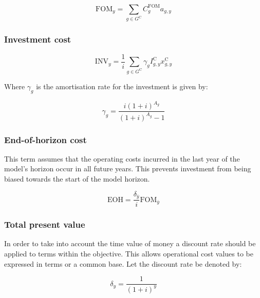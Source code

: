 \documentclass{article}
\newcommand{\sGeneratorsCandidate}{G^{\mathrm{C}}}
\newcommand{\iGenerator}{g}
\newcommand{\iYear}{y}
\newcommand{\iYearTerminal}{\overline{\iYear}}
\newcommand{\iScenario}{s}
\newcommand{\cOperatingCost}[1][\iYear,\iScenario]{\mathrm{OP}_{#1}}
\newcommand{\cFixedOperationsMaintenanceCost}[1][\iYear]{\mathrm{FOM}_{#1}}
\newcommand{\cFixedOperationsMaintenanceCostGenerator}[1][\iGenerator]{C^{\mathrm{FOM}}_{#1}}
\newcommand{\cAmortisationRate}[1][\iGenerator]{\gamma_{#1}}
\newcommand{\cCandidateInvestmentCost}[1][\iGenerator,\iYear]{I^{\mathrm{C}}_{#1}}
\newcommand{\cInvestmentCost}[1][\iYear]{\mathrm{INV}_{#1}}
\newcommand{\cInterestRate}{i}
\newcommand{\cAssetLifetime}[1][\iGenerator]{A_{#1}}
\newcommand{\cDiscountRate}[1][\iYear]{\delta_{#1}}
\newcommand{\vInstalledCapacity}[1][\iGenerator,\iYear]{x^{\mathrm{C}}_{#1}}
\newcommand{\vInstalledCapacityTotal}[1][\iGenerator,\iYear]{a_{#1}}
\newcommand{\cEndOfHorizonCost}{\mathrm{EOH}}
\begin{document}
\begin{equation}
\cFixedOperationsMaintenanceCost = \sum\limits_{\iGenerator \in \sGeneratorsCandidate} \cFixedOperationsMaintenanceCostGenerator \vInstalledCapacityTotal
\end{equation}

\subsubsection{Investment cost}

\begin{equation}
	\cInvestmentCost = \frac{1}{\cInterestRate}\sum\limits_{g\in \sGeneratorsCandidate} \cAmortisationRate  \cCandidateInvestmentCost \vInstalledCapacity
\end{equation}

Where $\cAmortisationRate$ is the amortisation rate for the investment is given by:

\begin{equation}
	\cAmortisationRate = \frac{\cInterestRate(1+\cInterestRate)^{\cAssetLifetime}}{(1+\cInterestRate)^{\cAssetLifetime} - 1}
\end{equation}

\subsubsection{End-of-horizon cost}
This term assumes that the operating costs incurred in the last year of the model's horizon occur in all future years. This prevents investment from being biased towards the start of the model horizon.

\begin{equation}
	\cEndOfHorizonCost = \frac{\cDiscountRate[\iYearTerminal]}{\cInterestRate} 
	\cFixedOperationsMaintenanceCost[\iYearTerminal] 
\end{equation}

\subsubsection{Total present value}
In order to take into account the time value of money a discount rate should be applied to terms within the objective. This allows operational cost values to be expressed in terms or a common base. Let the discount rate be denoted by:

\begin{equation}
	\cDiscountRate = \frac{1}{(1 + \cInterestRate)^{\iYear}}
\end{equation}
\end{document}
